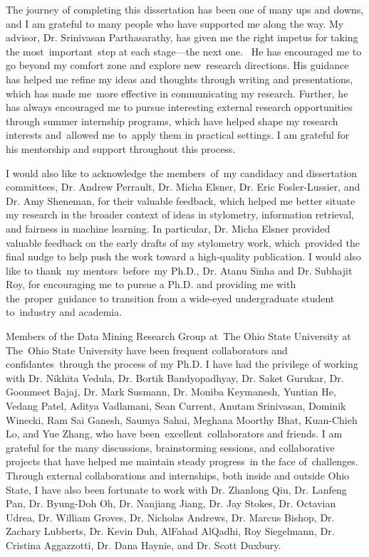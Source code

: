 
The journey of completing this dissertation has been one of many ups and downs, and I am grateful to many people who have supported me along the way.
My advisor, Dr. Srinivasan Parthasarathy, has given me the right impetus for taking the most important step at each stage—the next one. 
He has encouraged me to go beyond my comfort zone and explore new research directions.
His guidance has helped me refine my ideas and thoughts through writing and presentations, which has made me more effective in communicating my research.
Further, he has always encouraged me to pursue interesting external research opportunities through summer internship programs, which have helped shape my research interests and allowed me to apply them in practical settings.
I am grateful for his mentorship and support throughout this process.

I would also like to acknowledge the members of my candidacy and dissertation committees, Dr. Andrew Perrault, Dr. Micha Elsner, Dr. Eric Fosler-Lussier, and Dr. Amy Sheneman, for their valuable feedback, which helped me better situate my research in the broader context of ideas in stylometry, information retrieval, and fairness in machine learning.
In particular, Dr. Micha Elsner provided valuable feedback on the early drafts of my stylometry work, which provided the final nudge to help push the work toward a high-quality publication.
I would also like to thank my mentors before my Ph.D., Dr. Atanu Sinha and Dr. Subhajit Roy, for encouraging me to pursue a Ph.D. and providing me with the proper guidance to transition from a wide-eyed undergraduate student to industry and academia.

Members of the Data Mining Research Group at The Ohio State University at The Ohio State University have been frequent collaborators and confidantes through the process of my Ph.D.
I have had the privilege of working with Dr. Nikhita Vedula, Dr. Bortik Bandyopadhyay, Dr. Saket Gurukar, Dr. Goonmeet Bajaj, Dr. Mark Susmann, Dr. Moniba Keymanesh, Yuntian He, Vedang Patel, Aditya Vadlamani, Sean Current, Anutam Srinivasan, Dominik Winecki, Ram Sai Ganesh, Saumya Sahai, Meghana Moorthy Bhat, Kuan-Chieh Lo, and Yue Zhang, who have been excellent collaborators and friends.
I am grateful for the many discussions, brainstorming sessions, and collaborative projects that have helped me maintain steady progress in the face of challenges.
Through external collaborations and internships, both inside and outside Ohio State, I have also been fortunate to work with Dr. Zhanlong Qiu, Dr. Lanfeng Pan, Dr. Byung-Doh Oh, Dr. Nanjiang Jiang, Dr. Jay Stokes, Dr. Octavian Udrea, Dr. William Groves, Dr. Nicholas Andrews, Dr. Marcus Bishop, Dr. Zachary Lubberts, Dr. Kevin Duh, AlFahad AlQadhi, Roy Siegelmann, Dr. Cristina Aggazzotti, Dr. Dana Haynie, and Dr. Scott Duxbury.

